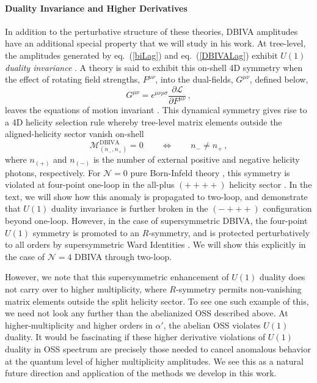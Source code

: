 \documentclass[12pt,letter]{article}
\def\eqn#1{eq.~(\ref{#1})}
\def\be{\begin{equation}}
\def\ee{\end{equation}}
\begin{document}
\paragraph{Duality Invariance and Higher Derivatives}
In addition to the perturbative structure of these theories, DBIVA amplitudes have an additional special property that we will study in his work. At tree-level, the amplitudes generated by \eqn{biLag} and \eqn{DBIVALag} exhibit $U(1)$ \textit{duality invariance} \cite{Bossard:2012xs,Novotny:2018iph}. A theory is said to exhibit this on-shell 4D symmetry when the effect of rotating field strengths, $F^{\mu\nu}$, into the dual-fields, $G^{\mu\nu}$, defined below,
\be
G^{\mu\nu} = \epsilon^{\mu\nu\rho\sigma}\frac{\partial \mathcal{L}}{\partial F^{\mu\nu}}\,,
\ee
leaves the equations of motion invariant \cite{Gibbons:1995ap,Babaei-Aghbolagh:2013hia}. This dynamical symmetry gives rise to a 4D helicity selection rule \cite{Novotny:2018iph} whereby tree-level matrix elements outside the aligned-helicity sector vanish on-shell
\be
\mathcal{M}^{\text{DBIVA}}_{(n_{-}, n_{+})} =0 \qquad \Leftrightarrow \qquad n_{-}\neq n_{+}\,,
\ee
where $n_{(+)}$ and $n_{(-)}$ is the number of external positive and negative helicity photons, respectively. For $\mathcal{N}=0$ pure Born-Infeld theory \cite{Born:1934gh,Schrodinger:1935oqa}, this symmetry is violated at four-point one-loop in the all-plus $(++++)$ helicity sector \cite{Elvang:2019twd}. In the text, we will show how this anomaly is propagated to two-loop, and demonstrate that $U(1)$ duality invariance is further broken in the $(-+++)$ configuration beyond one-loop. However, in the case of supersymmetric DBIVA, the four-point $U(1)$ symmetry is promoted to an $R$-symmetry, and is protected perturbatively to all orders by supersymmetric Ward Identities \cite{Heydeman:2017yww}. We will show this explicitly in the case of $\mathcal{N}=4$ DBIVA through two-loop.

 However, we note that this supersymmetric enhancement of $U(1)$ duality does not carry over to higher multiplicity, where $R$-symmetry permits non-vanishing matrix elements outside the split helicity sector. To see one such example of this, we need not look any further than the abelianized OSS described above. At higher-multiplicity and higher orders in $\alpha'$, the abelian OSS violates $U(1)$ duality. It would be fascinating if these higher derivative violations of $U(1)$ duality in OSS spectrum are precisely those needed to cancel anomalous behavior at the quantum level of higher multiplicity amplitudes. We see this as a natural future direction and application of the methods we develop in this work. 
\end{document}
